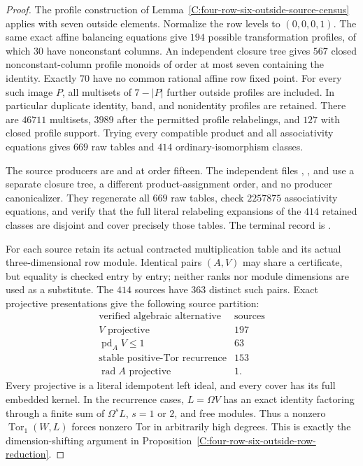 \begin{proof}
The profile construction of
Lemma~\ref{C:four-row-six-outside-source-census} applies with seven
outside elements.  Normalize the row levels to $(0,0,0,1)$.
The same exact affine balancing equations give $194$ possible
transformation profiles, of which $30$ have nonconstant columns.
An independent closure tree gives $567$ closed nonconstant-column
profile monoids of order at most seven containing the identity.
Exactly $70$ have no common rational affine row fixed point.
For every such image $P$, all multisets of $7-|P|$ further outside
profiles are included.  In particular duplicate identity, band,
and nonidentity profiles are retained.
There are $46711$ multisets, $3989$ after the permitted profile
relabelings, and $127$ with closed profile support.  Trying every
compatible product and all associativity equations gives $669$
raw tables and $414$ ordinary-isomorphism classes.

The source producers are 
and  at order fifteen.
The independent files
,
, and
use a separate closure tree, a different product-assignment order,
and no producer canonicalizer.  They regenerate all $669$ raw
tables, check $2257875$ associativity equations, and verify that the
full literal relabeling expansions of the $414$ retained classes
are disjoint and cover precisely those tables.  The terminal record is
.

For each source retain its actual contracted multiplication table
and its actual three-dimensional row module.  Identical pairs
$(A,V)$ may share a certificate, but equality is checked entry by
entry; neither ranks nor module dimensions are used as a substitute.
The $414$ sources have $363$ distinct such pairs.  Exact projective
presentations give the following source partition:
\[
\begin{array}{c|r}
\text{verified algebraic alternative}&\text{sources}\\\hline
V\text{ projective}&197\\
\operatorname{pd}_A V\leq1&63\\
\text{stable positive-Tor recurrence}&153\\
\operatorname{rad}A\text{ projective}&1.
\end{array}
\]
Every projective is a literal idempotent left ideal, and every cover
has its full embedded kernel.  In the recurrence cases,
$L=\Omega V$ has an exact identity factoring through a finite sum
of $\Omega^sL$, $s=1$ or $2$, and free modules.  Thus a nonzero
$\operatorname{Tor}_1(W,L)$ forces nonzero Tor in arbitrarily high
degrees.  This is exactly the dimension-shifting argument in
Proposition~\ref{C:four-row-six-outside-row-reduction}.


\end{proof}

